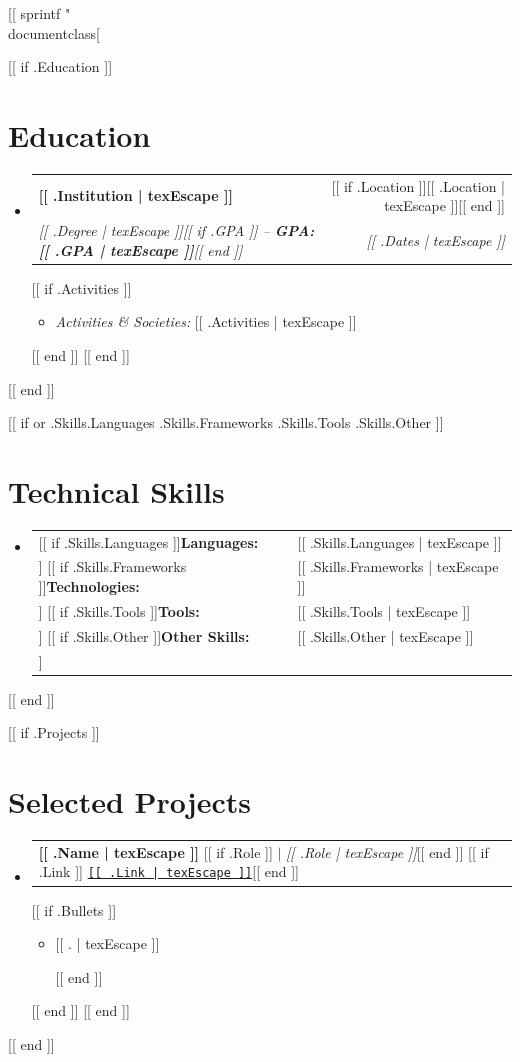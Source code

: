 [[ sprintf "\\documentclass[%
\makeatletter
\newcommand{\cpSubheading}[4]{%
  \vspace{-1pt}
  \item
  \begin{tabular*}{\linewidth}{@{}l@{\extracolsep{\fill}}r@{}}
    \textbf{#1} & \small #2 \\
    \textit{\small #3} & \textit{\small #4} \\
  \end{tabular*}\vspace{-6pt}%
}
\newcommand{\cpProjectRow}[2]{%
  \item
  \begin{tabular*}{\linewidth}{@{}l@{\extracolsep{\fill}}r@{}}
    \small #1 & \small #2 \\
  \end{tabular*}\vspace{-6pt}%
}
\newcommand{\cpItem}[1]{%
  \item\small{#1\vspace{-2pt}}%
}
\newcommand{\cpListStart}{\begin{itemize}[leftmargin=0.15in, label={}]}
\newcommand{\cpListEnd}{\end{itemize}}
\newcommand{\cpBulletStart}{\begin{itemize}[leftmargin=0.2in, label={\tiny$\bullet$}, itemsep=0pt, topsep=2pt, parsep=0pt]}
\newcommand{\cpBulletEnd}{\end{itemize}\vspace{-4pt}}
\makeatother
\begin{document}
[[ if .Education ]]
\section{Education}
\cpListStart
  [[ range .Education ]]
  \cpSubheading
    {[[ .Institution | texEscape ]]}{[[ if .Location ]][[ .Location | texEscape ]][[ end ]]}
    {[[ .Degree | texEscape ]][[ if .GPA ]] -- \textbf{GPA: [[ .GPA | texEscape ]]}[[ end ]]}{[[ .Dates | texEscape ]]}
    [[ if .Activities ]]
    \cpBulletStart
      \cpItem{\textit{Activities \& Societies:} [[ .Activities | texEscape ]]}
    \cpBulletEnd
    [[ end ]]
  [[ end ]]
\cpListEnd
[[ end ]]

[[ if or .Skills.Languages .Skills.Frameworks .Skills.Tools .Skills.Other ]]
\section{Technical Skills}
\vspace{2pt}
\cpListStart
  \small\item{
    \begin{tabular}{@{}p{2.6cm}@{}p{\dimexpr\linewidth-2.6cm\relax}@{}}
      [[ if .Skills.Languages ]]\textbf{Languages:}    & [[ .Skills.Languages | texEscape ]] \\[3pt][[ end ]]
      [[ if .Skills.Frameworks ]]\textbf{Technologies:} & [[ .Skills.Frameworks | texEscape ]] \\[3pt][[ end ]]
      [[ if .Skills.Tools ]]\textbf{Tools:}         & [[ .Skills.Tools | texEscape ]] \\[3pt][[ end ]]
      [[ if .Skills.Other ]]\textbf{Other Skills:}  & [[ .Skills.Other | texEscape ]] \\[[ end ]]
    \end{tabular}
  }
\cpListEnd
[[ end ]]

[[ if .Projects ]]
\section{Selected Projects}
\cpListStart
  [[ range .Projects ]]
  \cpProjectRow{%
    \textbf{[[ .Name | texEscape ]]}%
    [[ if .Role ]] $|$ \emph{[[ .Role | texEscape ]]}[[ end ]]%
    [[ if .Link ]] \href{https://[[ .Link | texEscape ]]}{\small\texttt{[[ .Link | texEscape ]]}}[[ end ]]%
  }{}
  [[ if .Bullets ]]
  \cpBulletStart
    [[ range texLines .Bullets ]]\cpItem{[[ . | texEscape ]]}
    [[ end ]]
  \cpBulletEnd
  [[ end ]]
  [[ end ]]
\cpListEnd
[[ end ]]
\end{document}
